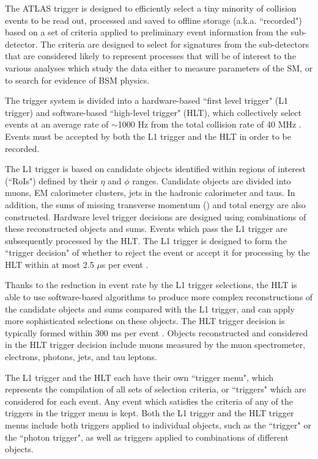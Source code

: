 The ATLAS trigger \cite{ATLAS_Trigger} is designed to efficiently select a tiny minority of collision events to be read out, processed and saved to offline storage (a.k.a. ``recorded") based on a set of criteria applied to preliminary event information from the sub-detector. The criteria are designed to select for signatures from the sub-detectors that are considered likely to represent processes that will be of interest to the various analyses which study the data either to measure parameters of the SM, or to search for evidence of BSM physics.

The trigger system is divided into a hardware-based ``first level trigger" (L1 trigger) and software-based ``high-level trigger" (HLT), which collectively select events at an average rate of \(\sim\)1000 Hz from the total collision rate of 40 MHz \cite{ATLAS_Trigger}. Events must be accepted by both the L1 trigger and the HLT in order to be recorded.

The L1 trigger is based on candidate objects identified within regions of interest (``RoIs") defined by their \(\eta\) and \(\phi\) ranges. Candidate objects are divided into muons, EM calorimeter clusters, jets in the hadronic calorimeter and taus. In addition, the sums of missing transverse momentum (\met) and total energy are also constructed. Hardware level trigger decisions are designed using combinations of these reconstructed objects and sums. Events which pass the L1 trigger are subsequently processed by the HLT. The L1 trigger is designed to form the ``trigger decision" of whether to reject the event or accept it for processing by the HLT within at most 2.5 \(\mu\)s per event \cite{ATLAS_Trigger}. 

Thanks to the reduction in event rate by the L1 trigger selections, the HLT is able to use software-based algorithms to produce more complex reconstructions of the candidate objects and sums compared with the L1 trigger, and can apply more sophisticated selections on these objects. The HLT trigger decision is typically formed within 300 ms per event \cite{ATLAS_Trigger}. Objects reconstructed and considered in the HLT trigger decision include muons measured by the muon spectrometer, electrons, photons, jets, \met and tau leptons. 

The L1 trigger and the HLT each have their own ``trigger menu", which represents the compilation of all sets of selection criteria, or ``triggers" which are considered for each event. Any event which satisfies the criteria of any of the triggers in the trigger menu is kept. Both the L1 trigger and the HLT trigger menus include both triggers applied to individual objects, such as the ``\met trigger" or the ``photon trigger", as well as triggers applied to combinations of different objects.

